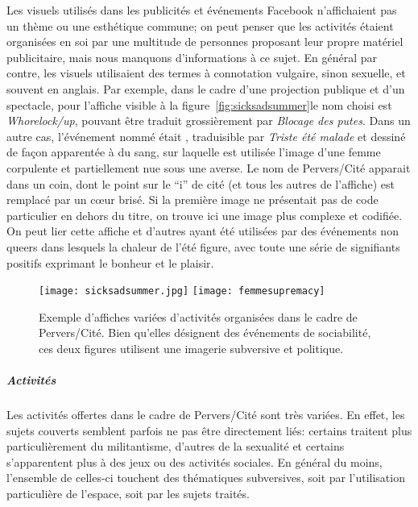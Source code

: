 Les visuels utilisés dans les publicités et événements Facebook n'affichaient pas un thème ou une esthétique commune; on peut penser que les activités étaient organisées en soi par une multitude de personnes proposant leur propre matériel publicitaire, mais nous manquons d'informations à ce sujet.
En général par contre, les visuels utilisaient des termes à connotation vulgaire, sinon sexuelle, et souvent en anglais.
Par exemple, dans le cadre d'une projection publique et d'un spectacle, pour l'affiche visible à la figure~\ref{fig:sicksadsummer}le nom choisi est \emph{Whorelock/up}, pouvant être traduit grossièrement par \emph{Blocage des putes}.
Dans un autre cas, l'événement nommé était , traduisible par \emph{Triste été malade} et dessiné de façon apparentée à du sang, sur laquelle est utilisée l'image d'une femme corpulente et partiellement nue sous une averse.
Le nom de Pervers/Cité apparait dans un coin, dont le point sur le \enquote{i} de cité (et tous les autres de l'affiche) est remplacé par un cœur brisé.
Si la première image ne présentait pas de code particulier en dehors du titre, on trouve ici une image plus complexe et codifiée.
On peut lier cette affiche et d'autres ayant été utilisées par des événements non queers dans lesquels la chaleur de l'été figure, avec toute une série de signifiants positifs exprimant le bonheur et le plaisir.

\begin{figure}[ht]
 \centering
 {\texttt{[image: sicksadsummer.jpg]}}
 {\texttt{[image: femmesupremacy]}}
 \caption[Exemples d'affiches de Pervers/Cité]{Exemple d'affiches variées d'activités organisées dans le cadre de Pervers/Cité. Bien qu'elles désignent des événements de sociabilité, ces deux figures utilisent une imagerie subversive et politique.}\label{figs:activiteespervscite}
\end{figure}

\subparagraph{Activités}
\label{subsec:activitesperverscite}
Les activités offertes dans le cadre de Pervers/Cité sont très variées.
En effet, les sujets couverts semblent parfois ne pas être directement liés: certains traitent plus particulièrement du militantisme, d'autres de la sexualité et certains s'apparentent plus à des jeux ou des activités sociales.
En général du moins, l'ensemble de celles-ci touchent des thématiques subversives, soit par l'utilisation particulière de l'espace, soit par les sujets traités.

